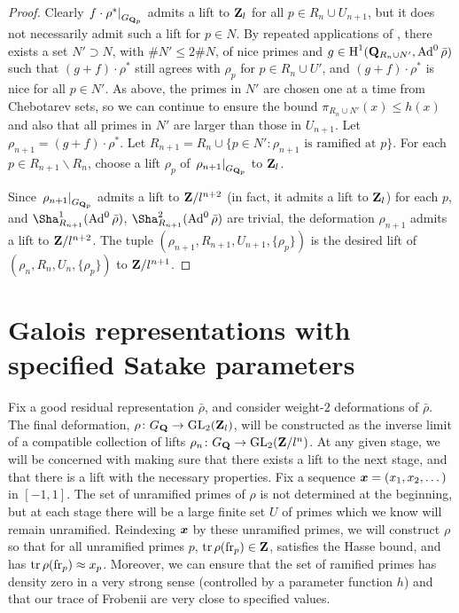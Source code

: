 \begin{proof}
Clearly $\left. f\cdot \rho^\ast\right|_{G_{\mathbf{Q}_p}}$ admits a lift to $\mathbf{Z}_l$ 
for all $p\in R_n\cup U_{n+1}$, but it does not necessarily admit such a lift for 
$p\in N$. By repeated applications of \cite[Prop.~3.10]{pande-2011}, there 
exists a set $N'\supset N$, with $\# N'\leqslant 2\# N$, of nice primes and 
$g\in \operatorname{H}^1(\mathbf{Q}_{R_n\cup N'},\operatorname{Ad}^0\bar\rho)$ such that 
$(g+f)\cdot \rho^\ast$ still agrees with $\rho_p$ for $p\in R_n\cup U'$, and 
$(g+f)\cdot \rho^\ast$ is nice for all $p\in N'$. As above, the primes in $N'$ 
are chosen one at a time from Chebotarev sets, so we can continue to ensure the 
bound $\pi_{R_n\cup N'}(x)\leqslant h(x)$ and also that all primes in $N'$ 
are larger than those in $U_{n+1}$. Let $\rho_{n+1} = (g+f) \cdot \rho^\ast$. Let 
$R_{n+1} = R_n\cup \{p\in N' : \rho_{n+1}\text{ is ramified at }p\}$. For each 
$p\in R_{n+1}\smallsetminus R_n$, choose a lift $\rho_p$ of 
$\left. \rho_{n+1}\right|_{G_{\mathbf{Q}_p}}$ to $\mathbf{Z}_l$. 

Since $\left.\rho_{n+1}\right|_{G_{\mathbf{Q}_p}}$ admits a lift to $\mathbf{Z}/l^{n+2}$ (in 
fact, it admits a lift to $\mathbf{Z}_l$) for each $p$, and 
$\Sha_{R_{n+1}}^1(\Ad^0\bar\rho)$, $\Sha_{R_{n+1}}^2(\Ad^0\bar\rho)$ are 
trivial, the deformation $\rho_{n+1}$ admits a lift to $\mathbf{Z}/l^{n+2}$. The tuple 
$(\rho_{n+1},R_{n+1},U_{n+1},\{\rho_p\})$ is the desired lift of 
$(\rho_n,R_n,U_n,\{\rho_p\})$ to $\mathbf{Z}/l^{n+1}$. 
\end{proof}





\section{Galois representations with specified Satake parameters}

Fix a good residual representation $\bar\rho$, and consider weight-$2$ 
deformations of $\bar\rho$. The final deformation, 
$\rho\colon G_{\mathbf{Q}} \to \operatorname{GL}_2(\mathbf{Z}_l)$, will be constructed as the inverse limit 
of a compatible collection of lifts $\rho_n\colon G_{\mathbf{Q}} \to \operatorname{GL}_2(\mathbf{Z}/l^n)$. At 
any given stage, we will be concerned with making sure that there exists a 
lift to the next stage, and that there is a lift with the necessary properties. 
Fix a sequence ${\boldsymbol x}=(x_1,x_2,\dots)$ in $[-1,1]$. The set of unramified primes 
of $\rho$ is not determined at the beginning, but at each stage there will be 
a large finite set $U$ of primes which we know will remain unramified. 
Reindexing ${\boldsymbol x}$ by these unramified primes, we will construct $\rho$ so that 
for all unramified primes $p$, $\operatorname{tr}\rho(\mathrm{fr}_p)\in \mathbf{Z}$, satisfies the Hasse 
bound, and has $\operatorname{tr}\rho(\mathrm{fr}_p) \approx x_p$. Moreover, we can ensure that the 
set of ramified primes has density zero in a very strong sense (controlled by a 
parameter function $h$) and that our trace of Frobenii are very close to 
specified values. 

